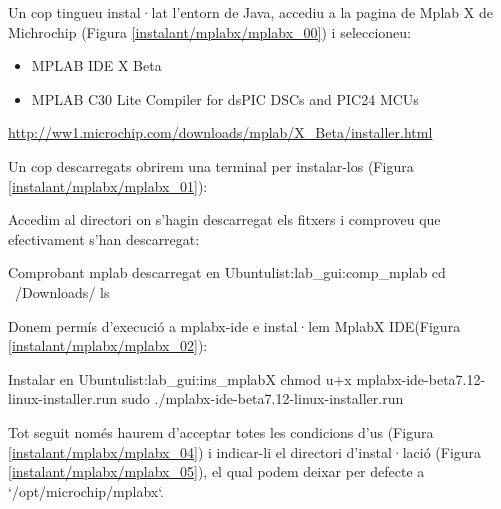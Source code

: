 Un cop tingueu instal·lat l'entorn de Java, accediu a la pagina de Mplab X de Michrochip (Figura \ref{instalant/mplabx/mplabx_00}) i seleccioneu:

\begin{itemize}
	\item MPLAB IDE X Beta
	\item MPLAB C30 Lite Compiler for dsPIC DSCs and PIC24 MCUs
\end{itemize}

\url{http://ww1.microchip.com/downloads/mplab/X_Beta/installer.html}

	
	
Un cop descarregats obrirem una terminal per instalar-los (Figura \ref{instalant/mplabx/mplabx_01}):


Accedim al directori on s'hagin descarregat els fitxers i comproveu que efectivament s'han descarregat:

\begin{code_bash}{Comprobant mplab descarregat en Ubuntu}{list:lab_gui:comp_mplab}
cd ~/Downloads/
ls
\end{code_bash}

Donem permís d'execució a mplabx-ide e instal·lem MplabX IDE(Figura \ref{instalant/mplabx/mplabx_02}):

\begin{code_bash}{Instalar \MplabX en Ubuntu}{list:lab_gui:ins_mplabX}
chmod u+x mplabx-ide-beta7.12-linux-installer.run
sudo ./mplabx-ide-beta7.12-linux-installer.run
\end{code_bash}


Tot seguit només haurem d'acceptar totes les condicions d'us (Figura \ref{instalant/mplabx/mplabx_04}) i indicar-li el directori d'instal·lació (Figura \ref{instalant/mplabx/mplabx_05}), el qual podem deixar per defecte a `/opt/microchip/mplabx`.


